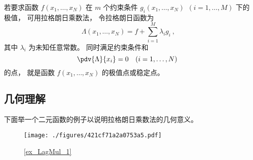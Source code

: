 

若要求函数 $f(x_1,\dots, x_N)$ 在 $m$ 个约束条件 $g_i(x_1, \dots, x_N)\ \ (i = 1,\dots, M)$ 下的极值， 可用拉格朗日乘数法， 令拉格朗日函数为
\begin{equation}
\Lambda(x_1,\dots, x_N) = f + \sum_{i=1}^M \lambda_i g_i~,
\end{equation} 
其中 $\lambda_i$ 为未知任意常数。 同时满足约束条件和
\begin{equation}
\pdv{\Lambda}{x_i} = 0 \quad (i = 1,\dots, N)~
\end{equation}
的点， 就是函数 $f(x_1, \dots, x_N)$ 的极值点或稳定点。

\subsection{几何理解}

下面举一个二元函数的例子以说明拉格朗日乘数法的几何意义。

\begin{figure}[ht]
\centering
\texttt{[image: ./figures/421cf71a2a0753a5.pdf]}
\caption{\autoref{ex_LagMul_1} } \label{fig_LagMul_1}
\end{figure}

